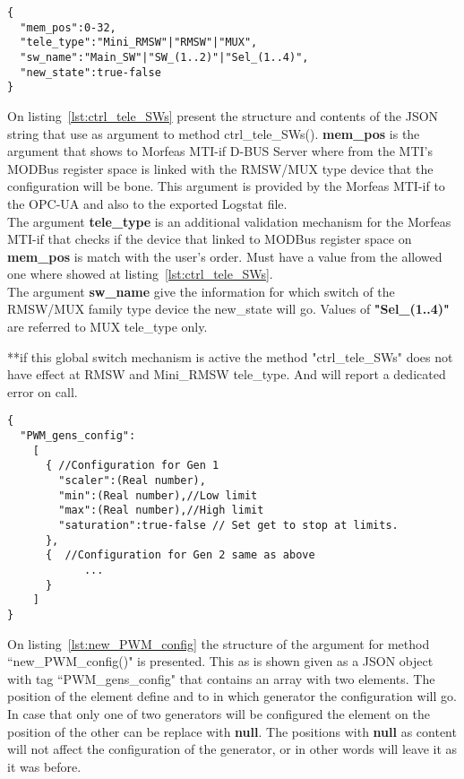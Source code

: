 \begin{lstlisting}[frame=single,caption=Argument for ctrl\_tele\_SWs(), label=lst:ctrl_tele_SWs]
{
  "mem_pos":0-32,
  "tele_type":"Mini_RMSW"|"RMSW"|"MUX",
  "sw_name":"Main_SW"|"SW_(1..2)"|"Sel_(1..4)",
  "new_state":true-false
}
\end{lstlisting}
On listing~\ref{lst:ctrl_tele_SWs} present the structure and contents of the JSON string that use as argument to method ctrl\_tele\_SWs().
\textbf{mem\_pos} is the argument that shows to Morfeas MTI-if D-BUS Server where from the MTI's MODBus register space is linked with the RMSW/MUX type device that the configuration will be bone.
This argument is provided by the Morfeas MTI-if to the OPC-UA and also to the exported Logstat file.\\
The argument \textbf{tele\_type} is an additional validation mechanism for the Morfeas MTI-if that checks if the device that linked to MODBus register space on \textbf{mem\_pos} is match with the user's order.
Must have a value from the allowed one where showed at listing~\ref{lst:ctrl_tele_SWs}.\\
The argument \textbf{sw\_name} give the information for which switch of the RMSW/MUX family type device the new\_state will go. Values of \textbf{"Sel\_(1..4)"} are referred to MUX tele\_type only.

**if this global switch mechanism is active the method "ctrl\_tele\_SWs" does not have effect at RMSW and Mini\_RMSW tele\_type. And will report a dedicated error on call.

\begin{lstlisting}[frame=single,caption=Argument for new\_PWM\_config(), label=lst:new_PWM_config]
{
  "PWM_gens_config":
    [
	  { //Configuration for Gen 1
		"scaler":(Real number),
		"min":(Real number),//Low limit
		"max":(Real number),//High limit
		"saturation":true-false // Set get to stop at limits.
	  },
	  {  //Configuration for Gen 2 same as above
            ...
	  }
    ]
}
\end{lstlisting}
On listing~\ref{lst:new_PWM_config} the structure of the argument for method ``new\_PWM\_config()" is presented.
This as is shown given as a JSON object with tag ``PWM\_gens\_config" that contains an array with two elements. The position of the element define and to in which generator the configuration will go.
In case that only one of two generators will be configured the element on the position of the other can be replace with \textbf{null}.
The positions with \textbf{null} as content will not affect the configuration of the generator, or in other words will leave it as it was before.

